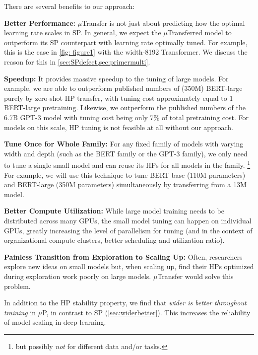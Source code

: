 \documentclass{article}
\theoremstyle{definition}
\begin{document}
There are several benefits to our approach:
\begin{enumerate*}
    \item \textbf{Better Performance:} $\mu$Transfer is not just about predicting how the optimal learning rate scales in SP.
    In general, we expect the $\mu$Transferred model to outperform its SP counterpart with learning rate optimally tuned.
    For example, this is the case in \cref{fig: figure1} with the width-8192 Transformer.
    We discuss the reason for this in \cref{sec:SPdefect,sec:primermulti}.
    \item \textbf{Speedup:} It provides massive speedup to the tuning of large models.
    For example, we are able to outperform published numbers of (350M) BERT-large \citep{devlin_bert_2019}
    purely by zero-shot HP transfer, with tuning cost approximately equal to 1 BERT-large pretraining.
    Likewise, we outperform the published numbers of the 6.7B GPT-3 model \citep{brown2020language} with tuning cost being only 7\% of total pretraining cost.
    For models on this scale, HP tuning is not feasible at all without our approach.%
    \item \textbf{Tune Once for Whole Family:} For any fixed family of models with varying width and depth (such as the BERT family or the GPT-3 family), we only need to tune a single small model and can reuse its HPs for all models in the family.%
    \footnote{but possibly \emph{not} for different data and/or tasks.}
    For example, we will use this technique to tune BERT-base (110M parameters) and BERT-large (350M parameters) simultaneously by transferring from a 13M model.
    \item \textbf{Better Compute Utilization:} While large model training needs to be distributed across many GPUs, the small model tuning can happen on individual GPUs, greatly increasing the level of parallelism for tuning (and in the context of organizational compute clusters, better scheduling and utilization ratio).
    \item \textbf{Painless Transition from Exploration to Scaling Up:}
    Often, researchers explore new ideas on small models but, when scaling up, find their HPs optimized during exploration work poorly on large models.
    $\mu$Transfer would solve this problem.
\end{enumerate*}

\enlargethispage*{\baselineskip}

In addition to the HP stability property, we find that \emph{wider is better throughout training} in $\mu$P, in contrast to SP (\cref{sec:widerbetter}).
This increases the reliability of model scaling in deep learning.
\end{document}

